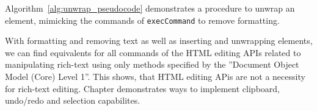 Algorithm~\ref{alg:unwrap_pseudocode} demonstrates a procedure to unwrap an element, mimicking the commands of \texttt{execCommand} to remove formatting.

With formatting and removing text as well as inserting and unwrapping elements, we can find equivalents for all commands of the HTML editing APIs related to manipulating rich-text using only methods specified by the ''Document Object Model (Core) Level 1''. This shows, that HTML editing APis are not a necessity for rich-text editing. Chapter  demonstrates ways to implement clipboard, undo/redo and selection capabilites.



